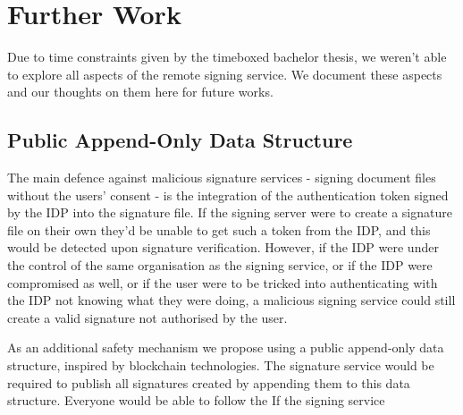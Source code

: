 \chapter{Further Work}\label{ch:further-work}
Due to time constraints given by the timeboxed bachelor thesis, we weren't able to explore all aspects of the remote signing service.
We document these aspects and our thoughts on them here for future works.

\section{Public Append-Only Data Structure}\label{sec:public-append-only-data-structure}
The main defence against malicious signature services - signing document files without the users' consent - is the integration of the authentication token signed by the \gls{IDP} into the signature file.
If the signing server were to create a signature file on their own they'd be unable to get such a token from the \gls{IDP}, and this would be detected upon signature verification.
However, if the \gls{IDP} were under the control of the same organisation as the signing service,
or if the \gls{IDP} were compromised as well,
or if the user were to be tricked into authenticating with the \gls{IDP} not knowing what they were doing,
a malicious signing service could still create a valid signature not authorised by the user.

As an additional safety mechanism we propose using a public append-only data structure, inspired by blockchain technologies.
The signature service would be required to publish all signatures created by appending them to this data structure.
Everyone would be able to follow the
If the signing service

